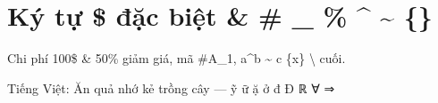 \documentclass[12pt,a4paper]{article}
\begin{document}
\section*{Ký tự \$ đặc biệt \& \# \_ \% \textasciicircum{} \textasciitilde{} \{\}}
Chi phí 100\$ \& 50\% giảm giá, mã \#A\_1, a\textasciicircum{}b \textasciitilde{} c \{x\} \textbackslash{} cuối.

Tiếng Việt: Ăn quả nhớ kẻ trồng cây — ỹ ữ ặ ở đ Đ ℝ ∀ ⇒

\medskip
\end{document}
